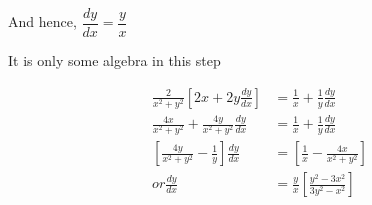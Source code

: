 \documentclass[14pt,fleqn]{extarticle}
\begin{document}
\newcard

And hence, $\dfrac{dy}{dx} = \dfrac{y}{x}$

\newcard

It is only some algebra in this step

%
\begin{align}
\frac{2}{x^2+y^2}\left[ 2x + 2y\frac{dy}{dx}\right] &= \frac{1}{x} + \frac{1}{y}\frac{dy}{dx}\\
\frac{4x}{x^2+y^2} + \frac{4y}{x^2+y^2}\frac{dy}{dx} &= \frac{1}{x} + \frac{1}{y}\frac{dy}{dx} \\
\left[ \frac{4y}{x^2+y^2}-\frac{1}{y} \right]\frac{dy}{dx} &= \left[\frac{1}{x}-\frac{4x}{x^2+y^2} \right]\\
or \frac{dy}{dx} &= \frac{y}{x}\left[ \frac{y^2-3x^2}{3y^2-x^2} \right]
\end{align}
\end{document}
